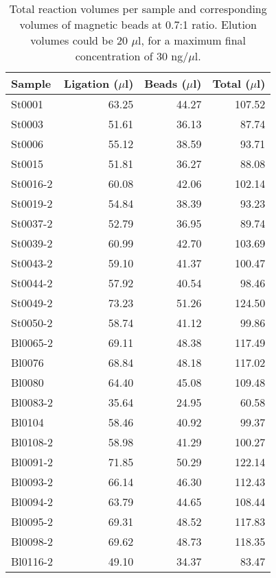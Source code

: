 \documentclass[a4paper,12pt,twosided]{article}
\begin{document}
\begin{table}
\begin{center}
\caption{Total reaction volumes per sample and corresponding volumes of magnetic beads at 0.7:1 ratio. Elution volumes could be 20 $\mu$l, for a maximum final concentration of 30 ng/$\mu$l.}\label{tau:cleanUpLigation}
\vspace*{0.2cm}
\begin{tabular}{lrrr}
\toprule
Sample&Ligation ($\mu$l)&Beads ($\mu$l)&Total ($\mu$l)\\
\midrule
St0001&63.25&44.27&107.52\\
St0003&51.61&36.13&87.74\\
St0006&55.12&38.59&93.71\\
St0015&51.81&36.27&88.08\\
St0016-2&60.08&42.06&102.14\\
St0019-2&54.84&38.39&93.23\\
St0037-2&52.79&36.95&89.74\\
St0039-2&60.99&42.70&103.69\\
St0043-2&59.10&41.37&100.47\\
St0044-2&57.92&40.54&98.46\\
St0049-2&73.23&51.26&124.50\\
St0050-2&58.74&41.12&99.86\\
Bl0065-2&69.11&48.38&117.49\\
Bl0076&68.84&48.18&117.02\\
Bl0080&64.40&45.08&109.48\\
Bl0083-2&35.64&24.95&60.58\\
Bl0104&58.46&40.92&99.37\\
Bl0108-2&58.98&41.29&100.27\\
Bl0091-2&71.85&50.29&122.14\\
Bl0093-2&66.14&46.30&112.43\\
Bl0094-2&63.79&44.65&108.44\\
Bl0095-2&69.31&48.52&117.83\\
Bl0098-2&69.62&48.73&118.35\\
Bl0116-2&49.10&34.37&83.47\\
\bottomrule
\end{tabular}
\end{center}
\end{table}
\end{document}
